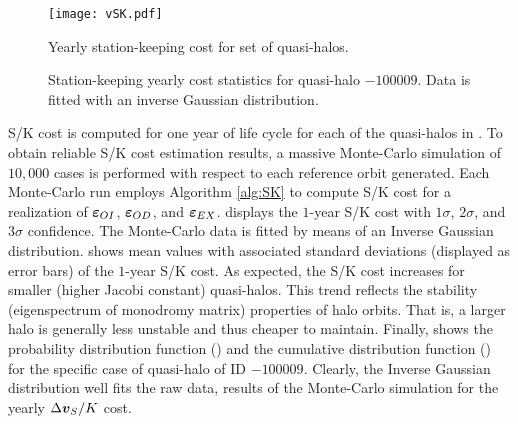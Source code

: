 %
\begin{figure}[t!]
	\centering
	\texttt{[image: vSK.pdf]}
	\caption{Yearly station-keeping cost for set of quasi-halos.}
	\label{fig:YearlySKcost}
\end{figure}
%
%
\begin{figure}[b!]
	\centering
	\hfill
	\hfill
	\hfill
	\caption[Inverse Gaussian distribution fit of station-keeping.]{Station-keeping yearly cost statistics for quasi-halo $-100009$. Data is fitted with an inverse Gaussian distribution.}
	\label{fig:Halo9distribution}
\end{figure}
%

S/K cost is computed for one year of life cycle for each of the quasi-halos in . To obtain reliable S/K cost estimation results, a massive Monte-Carlo simulation of $10,000$ cases is performed with respect to each reference orbit generated. Each Monte-Carlo run employs Algorithm \ref{alg:SK} to compute S/K cost for a realization of $\boldsymbol{\varepsilon}_{OI}$, $\boldsymbol{\varepsilon}_{OD}$, and $\boldsymbol{\varepsilon}_{EX}$.  displays the $1$-year S/K cost with $1\sigma$, $2\sigma$, and $3\sigma$ confidence. The Monte-Carlo data is fitted by means of an Inverse Gaussian distribution.  shows mean values with associated standard deviations (displayed as error bars) of the $1$-year S/K cost. As expected, the S/K cost increases for smaller (\ie higher Jacobi constant) quasi-halos. This trend reflects the stability (eigenspectrum of monodromy matrix) properties of halo orbits. That is, a larger halo is generally less unstable and thus cheaper to maintain. Finally,  shows the probability distribution function () and the cumulative distribution function () for the specific case of quasi-halo of ID $-100009$. Clearly, the Inverse Gaussian distribution well fits the raw data, results of the Monte-Carlo simulation for the yearly $\Delta\boldsymbol{v}_S/K$ cost.

